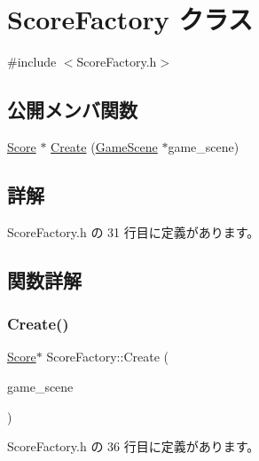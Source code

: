 \hypertarget{class_score_factory}{}\section{Score\+Factory クラス}
\label{class_score_factory}


{\ttfamily \#include $<$Score\+Factory.\+h$>$}

\subsection*{公開メンバ関数}
\begin{DoxyCompactItemize}
\item 
\mbox{\hyperlink{class_score}{Score}} $\ast$ \mbox{\hyperlink{class_score_factory_a1c3047d657151d5bbda8157a743b154d}{Create}} (\mbox{\hyperlink{class_game_scene}{Game\+Scene}} $\ast$game\+\_\+scene)
\end{DoxyCompactItemize}


\subsection{詳解}


 Score\+Factory.\+h の 31 行目に定義があります。



\subsection{関数詳解}
\mbox{\label{class_score_factory_a1c3047d657151d5bbda8157a743b154d}} 
\subsubsection{\texorpdfstring{Create()}{Create()}}
{\footnotesize\ttfamily \mbox{\hyperlink{class_score}{Score}}$\ast$ Score\+Factory\+::\+Create (\begin{DoxyParamCaption}\item[{\mbox{\hyperlink{class_game_scene}{Game\+Scene}} $\ast$}]{game\+\_\+scene }\end{DoxyParamCaption})\hspace{0.3cm}{\ttfamily [inline]}}



 Score\+Factory.\+h の 36 行目に定義があります。

